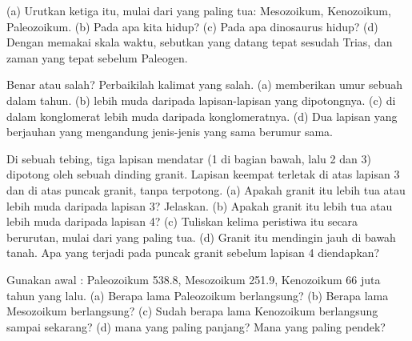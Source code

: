 \begin{exercise}[$\star$]\label{exo:g7:geological-time:3}
(a) Urutkan ketiga  itu, mulai dari yang paling tua: Mesozoikum,
Kenozoikum, Paleozoikum. (b) Pada  apa kita hidup? (c) Pada  apa
dinosaurus hidup? (d) Dengan memakai skala waktu, sebutkan 
yang datang tepat sesudah Trias, dan zaman yang tepat sebelum Paleogen.
\end{exercise}

\begin{exercise}[$\star$]\label{exo:g7:geological-time:4}
Benar atau salah? Perbaikilah kalimat yang salah. (a) 
memberikan umur sebuah  dalam tahun. (b)  lebih muda daripada
lapisan-lapisan yang dipotongnya. (c)  di dalam konglomerat lebih
muda daripada konglomeratnya. (d) Dua lapisan yang berjauhan yang
mengandung jenis-jenis  yang sama berumur sama.
\end{exercise}

\begin{exercise}[$\star\star$]\label{exo:g7:geological-time:5}
Di sebuah tebing, tiga lapisan mendatar (1 di bagian bawah, lalu 2 dan 3)
dipotong oleh sebuah dinding granit. Lapisan keempat terletak di atas
lapisan 3 dan di atas puncak granit, tanpa terpotong. (a) Apakah granit itu
lebih tua atau lebih muda daripada lapisan 3? Jelaskan. (b) Apakah granit
itu lebih tua atau lebih muda daripada lapisan 4? (c) Tuliskan kelima
peristiwa itu secara berurutan, mulai dari yang paling tua. (d) Granit itu
mendingin jauh di bawah tanah. Apa yang terjadi pada puncak granit sebelum
lapisan 4 diendapkan?
\end{exercise}

\begin{exercise}[$\star\star$]\label{exo:g7:geological-time:6}
Gunakan awal : Paleozoikum \num{538.8}, Mesozoikum \num{251.9},
Kenozoikum \num{66} juta tahun yang lalu. (a) Berapa lama Paleozoikum
berlangsung? (b) Berapa lama Mesozoikum berlangsung? (c) Sudah berapa lama
Kenozoikum berlangsung sampai sekarang? (d)  mana yang paling panjang?
Mana yang paling pendek?
\end{exercise}

